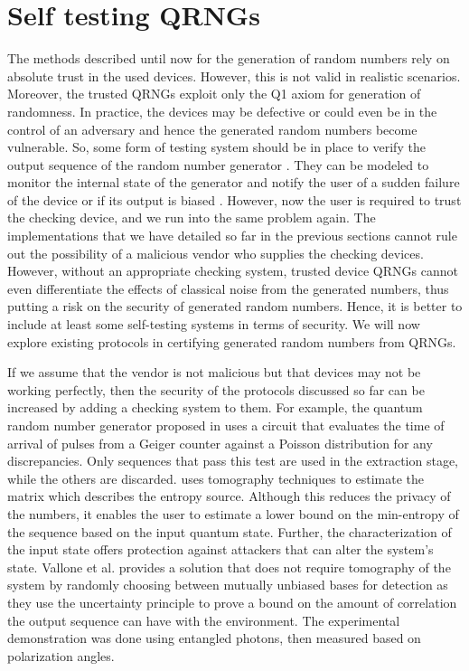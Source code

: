 \documentclass[]{interact}
\theoremstyle{plain}%
\theoremstyle{definition}
\theoremstyle{remark}
\begin{document}
\section{Self testing QRNGs\label{sec:selftesting}}
The methods described until now for the generation of random numbers rely on absolute trust in the used devices. However, this is not valid in realistic scenarios. Moreover, the trusted QRNGs exploit only the Q1 axiom for generation of randomness.   In practice, the devices may be defective or could even be in the control of an adversary and hence the generated random numbers become vulnerable. So, some form of testing system should be in place to verify the output sequence of the random number generator \cite{turan2018recommendation}. They can be modeled to monitor the internal state of the generator and notify the user of a sudden failure of the device or if its output is biased
\cite{fischer2012closer,bucci2005design}. However, now the user is required to trust the checking device, and we run into the same problem again. The implementations that we have detailed so far in the previous sections cannot rule out the possibility of a malicious vendor who supplies the checking devices. However, without an appropriate checking system, trusted device QRNGs cannot even differentiate the effects of classical noise from the generated numbers, thus putting a risk on the security of generated random numbers. Hence, it is better to include at least some self-testing systems in terms of security. We will now explore existing protocols in certifying generated random numbers from QRNGs.

If we assume that the vendor is not malicious but that devices may not be working perfectly, then the security of the protocols discussed so far can be increased by adding a checking system to them. For example, the 
quantum random number generator proposed in  \cite{saito2010randomness} uses a circuit that evaluates the time of arrival of pulses from a Geiger counter against a Poisson distribution for any discrepancies. Only sequences that pass this test are used in the extraction stage, while the others are discarded. \cite{fiorentino2006all} uses tomography techniques to estimate the matrix which describes the entropy source. Although this reduces the privacy of the numbers, it enables the user to estimate a lower bound on the min-entropy of the sequence based on the input quantum state. Further, the characterization of the input state offers protection against attackers that can alter the system's state. Vallone et al. \cite{PhysRevA.90.052327} provides a solution that does not require tomography of the system by randomly choosing between mutually unbiased bases for detection as they use the uncertainty principle to prove a bound on the amount of correlation the output sequence can have with the environment. The experimental demonstration was done using entangled photons, then measured based on polarization angles.
\end{document}

